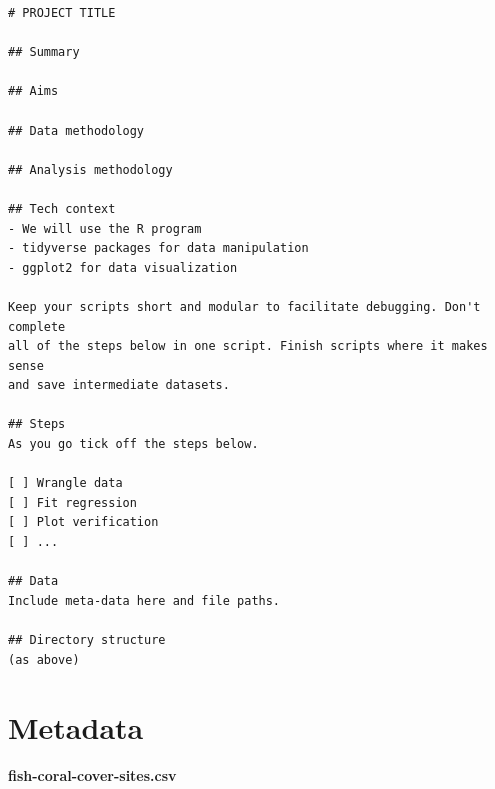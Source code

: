 \documentclass[
  letterpaper,
  DIV=11,
  numbers=noendperiod]{scrreprt}
\begin{document}
\begin{verbatim}
# PROJECT TITLE

## Summary

## Aims

## Data methodology

## Analysis methodology

## Tech context
- We will use the R program
- tidyverse packages for data manipulation
- ggplot2 for data visualization

Keep your scripts short and modular to facilitate debugging. Don't complete
all of the steps below in one script. Finish scripts where it makes sense
and save intermediate datasets.

## Steps
As you go tick off the steps below.

[ ] Wrangle data
[ ] Fit regression
[ ] Plot verification
[ ] ...

## Data
Include meta-data here and file paths.

## Directory structure
(as above)
\end{verbatim}

\section{Metadata}\label{metadata}

\textbf{fish-coral-cover-sites.csv}
\end{document}
